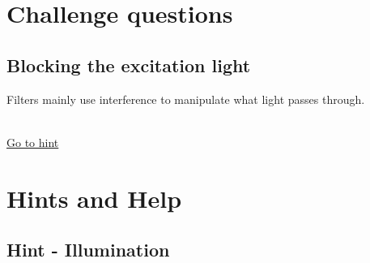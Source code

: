 \documentclass[a4paper]{report}
\begin{document}
	
	\section{Challenge questions}
	\hypertarget{hintBack-challenge}{}
	
	\subsection{Blocking the excitation light}
    Filters mainly use interference to manipulate what light passes through. 
    
	\\
	\hyperlink{hintTo-challenge}{Go to hint}
	
	
	\clearpage
    
	\section{Hints and Help}
	
    \subsection{Hint - Illumination}
	\hypertarget{hintTo-illumination}{}
	
\end{document}
